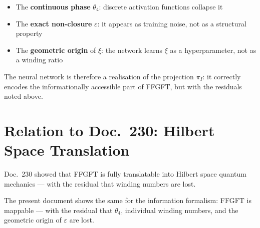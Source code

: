 \begin{itemize}
  \item The \textbf{continuous phase} $\theta_4$: discrete activation
        functions collapse it
  \item The \textbf{exact non-closure} $\varepsilon$: it appears as
        training noise, not as a structural property
  \item The \textbf{geometric origin} of $\xi$: the network learns $\xi$
        as a hyperparameter, not as a winding ratio
\end{itemize}

The neural network is therefore a realisation of the projection $\pi_I$:
it correctly encodes the informationally accessible part of FFGFT,
but with the residuals noted above.

\section{Relation to Doc.~230: Hilbert Space Translation}

Doc.~230 showed that FFGFT is fully translatable into Hilbert space
quantum mechanics --- with the residual that winding numbers are lost.

The present document shows the same for the information formalism:
FFGFT is mappable --- with the residual that $\theta_4$, individual
winding numbers, and the geometric origin of $\varepsilon$ are lost.

\begin{center}
\renewcommand{\arraystretch}{1.3}
{\small
{}
}
\end{center}

